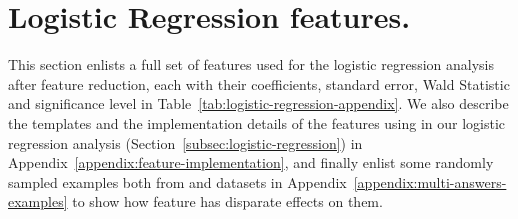
\section{Logistic Regression features.}
\label{appendix:logistic-regression}
This section enlists a full set of features used for the logistic regression analysis after feature reduction, each with their coefficients, standard error, Wald Statistic and significance level in Table~\ref{tab:logistic-regression-appendix}. We also describe the templates and the implementation details of the features using in our logistic regression analysis (Section~\ref{subsec:logistic-regression}) in Appendix~\ref{appendix:feature-implementation}, and finally enlist some randomly sampled examples both from \nq{} and \triviaqa{} datasets in Appendix~\ref{appendix:multi-answers-examples} to show how  feature has disparate effects on them.

